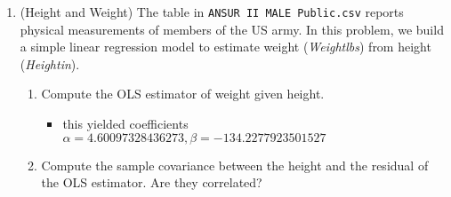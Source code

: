 \documentclass[12pt,twoside]{article}
\begin{document}
\begin{enumerate}
\item (Height and Weight)
The table in \texttt{ANSUR II MALE Public.csv} reports physical measurements of members of the US army. In this problem, we build a simple linear regression model to estimate weight (\textit{Weightlbs}) from height (\textit{Heightin}). %

\begin{enumerate}
\begin{itemize}
    \item here are all the functions used in question 4
        \inputminted[firstline=8, lastline=39, breaklines=True]{python}{hw_2_script.py}
\end{itemize}
	\item Compute the OLS estimator of weight given height.

    \begin{itemize}
        \item this yielded  coefficients $\alpha=4.60097328436273, \beta=-134.2277923501527$
    \end{itemize}
	\item Compute the sample covariance between the height and the residual of the OLS estimator. Are they correlated?


\end{enumerate}
\end{enumerate}
\end{document}
